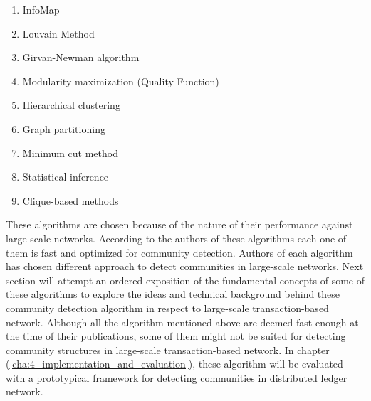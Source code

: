 \begin{enumerate}
	\item InfoMap
	\item Louvain Method
	\item Girvan-Newman algorithm
    \item Modularity maximization (Quality Function)
    \item Hierarchical clustering
	\item Graph partitioning
	\item Minimum cut method
	\item Statistical inference
	\item Clique-based methods
\end{enumerate}

These algorithms are chosen because of the nature of their performance against large-scale networks. According to the authors of these algorithms each one of them is fast and optimized for community detection. Authors of each algorithm has chosen different approach to detect communities in large-scale networks. Next section will attempt an ordered exposition of the fundamental concepts of some of these algorithms to explore the ideas and technical background behind these community detection algorithm in respect to large-scale transaction-based network. Although all the algorithm mentioned above are deemed fast enough at the time of their publications, some of them might not be suited for detecting community structures in large-scale transaction-based network. In chapter (\ref{cha:4_implementation_and_evaluation}), these algorithm will be evaluated with a prototypical framework for detecting communities in distributed ledger network.

